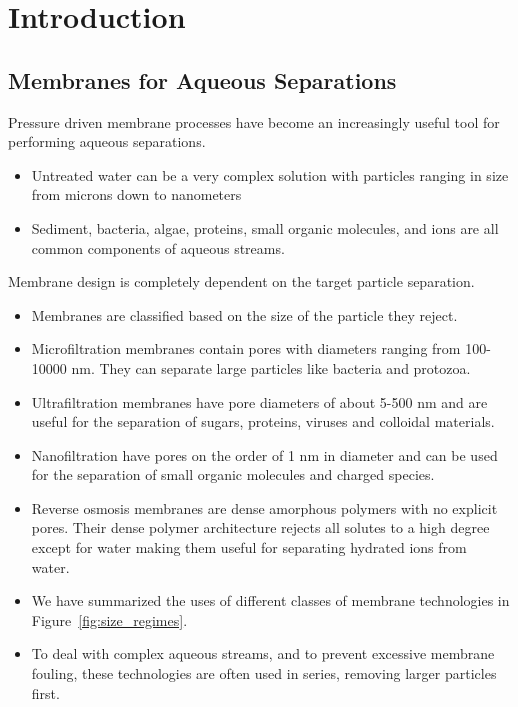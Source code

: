 \chapter{Introduction}\label{chapter:intro}

  \section{Membranes for Aqueous Separations}
  
  Pressure driven membrane processes have become an increasingly useful tool for
  performing aqueous separations.
  \begin{itemize}
    \item Untreated water can be a very complex solution with particles ranging
    in size from microns down to nanometers
    \item Sediment, bacteria, algae, proteins, small organic molecules, and ions
    are all common components of aqueous streams.
  \end{itemize}
  
  \noindent Membrane design is completely dependent on the target particle separation. 
  \begin{itemize}
    \item Membranes are classified based on the size of the particle they reject.
    \item Microfiltration membranes contain pores with diameters ranging from 100-10000 nm.
    They can separate large particles like bacteria and protozoa.~\cite{ma_functionalized_2014}
    \item Ultrafiltration membranes have pore diameters of about 5-500 nm and are useful for the 
    separation of sugars, proteins, viruses and colloidal materials.~\cite{yanful_ultrafiltration_2009}
    \item Nanofiltration have pores on the order of 1 nm in diameter and can be used for the separation
    of small organic molecules and charged species.~\cite{van_der_bruggen_review_2003}
    \item Reverse osmosis membranes are dense amorphous polymers with no explicit pores. Their
    dense polymer architecture rejects all solutes to a high degree except for water making
    them useful for separating hydrated ions from water.~\cite{warsinger_review_2018}
    \item We have summarized the uses of different classes of membrane 
    technologies in Figure~\ref{fig:size_regimes}.
    \item To deal with complex aqueous streams, and to prevent excessive membrane fouling, 
    these technologies are often used in series, removing larger particles first.~\cite{goosen_fouling_2005}
  \end{itemize}
  
